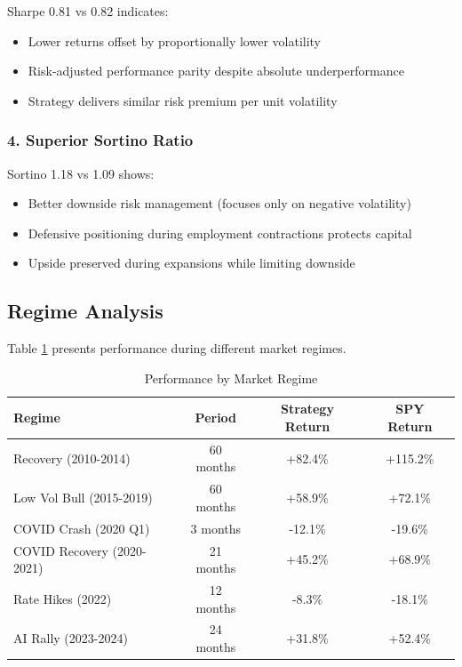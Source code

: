 \documentclass[12pt,a4paper]{article}
\begin{document}
Sharpe 0.81 vs 0.82 indicates:
\begin{itemize}
    \item Lower returns offset by proportionally lower volatility
    \item Risk-adjusted performance parity despite absolute underperformance
    \item Strategy delivers similar risk premium per unit volatility
\end{itemize}

\subsubsection{4. Superior Sortino Ratio}

Sortino 1.18 vs 1.09 shows:
\begin{itemize}
    \item Better downside risk management (focuses only on negative volatility)
    \item Defensive positioning during employment contractions protects capital
    \item Upside preserved during expansions while limiting downside
\end{itemize}

\subsection{Regime Analysis}

Table \ref{tab:regime} presents performance during different market regimes.

\begin{table}[H]
\centering
\caption{Performance by Market Regime}
\label{tab:regime}
\begin{tabular}{@{}lccc@{}}
\toprule
\textbf{Regime} & \textbf{Period} & \textbf{Strategy Return} & \textbf{SPY Return} \\
\midrule
Recovery (2010-2014) & 60 months & +82.4\% & +115.2\% \\
Low Vol Bull (2015-2019) & 60 months & +58.9\% & +72.1\% \\
COVID Crash (2020 Q1) & 3 months & -12.1\% & -19.6\% \\
COVID Recovery (2020-2021) & 21 months & +45.2\% & +68.9\% \\
Rate Hikes (2022) & 12 months & -8.3\% & -18.1\% \\
AI Rally (2023-2024) & 24 months & +31.8\% & +52.4\% \\
\bottomrule
\end{tabular}
\end{table}
\end{document}
